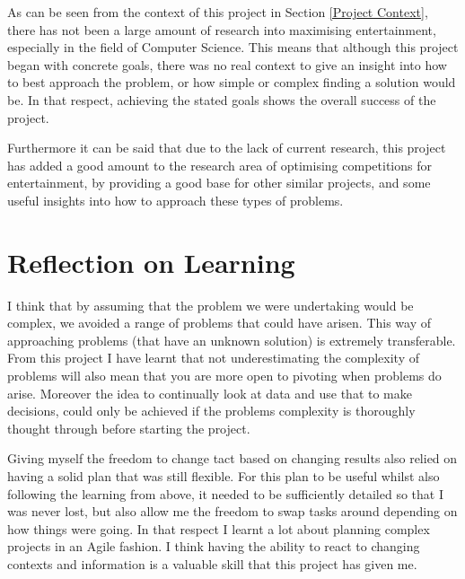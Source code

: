 \documentclass[12pt]{report}
\begin{document}
As can be seen from the context of this project in Section \ref{Project Context}, there has not been a large amount of research into maximising entertainment, especially in the field of Computer Science. This means that although this project began with concrete goals, there was no real context to give an insight into how to best approach the problem, or how simple or complex finding a solution would be. In that respect, achieving the stated goals shows the overall success of the project. 

Furthermore it can be said that due to the lack of current research, this project has added a good amount to the research area of optimising competitions for entertainment, by providing a good base for other similar projects, and some useful insights into how to approach these types of problems.

\section{Reflection on Learning}\label{Reflection}

I think that by assuming that the problem we were undertaking would be complex, we avoided a range of problems that could have arisen. This way of approaching problems (that have an unknown solution) is extremely transferable. From this project I have learnt that not underestimating the complexity of problems will also mean that you are more open to pivoting when problems do arise. Moreover the idea to continually look at data and use that to make decisions, could only be achieved if the problems complexity is thoroughly thought through before starting the project.

Giving myself the freedom to change tact based on changing results also relied on having a solid plan that was still flexible. For this plan to be useful whilst also following the learning from above, it needed to be sufficiently detailed so that I was never lost, but also allow me the freedom to swap tasks around depending on how things were going. In that respect I learnt a lot about planning complex projects in an Agile fashion. I think having the ability to react to changing contexts and information is a valuable skill that this project has given me.
\end{document}
